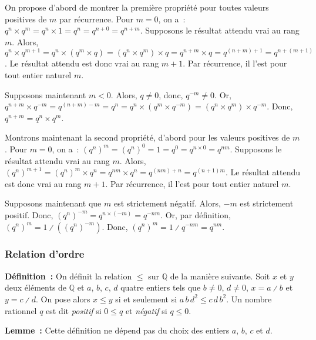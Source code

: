 On propose d'abord de montrer la première propriété pour toutes valeurs positives de $m$ par récurrence. 
Pour $m = 0$, on a : $q^n \times q^m = q^n \times 1 = q^n = q^{n + 0} = q^{n+m}$. 
Supposons le résultat attendu vrai au rang $m$.
Alors, $q^n \times q^{m+1} = q^n \times (q^m \times q) = (q^n \times q^m) \times q = q^{n+m} \times q = q^{(n+m) + 1} = q^{n + (m+1)}$.
Le résultat attendu est donc vrai au rang $m+1$. 
Par récurrence, il l'est pour tout entier naturel $m$.

Supposons maintenant $m < 0$. 
Alors, $q \neq 0$, donc, $q^{-m} \neq 0$.
Or, $q^{n+m} \times q^{-m} = q^{(n+m)-m} = q^n = q^n \times (q^m \times q^{-m}) = (q^n \times q^m) \times q^{-m}$. 
Donc, $q^{n+m} = q^n \times q^m$.

Montrons maintenant la second propriété, d'abord pour les valeurs positives de $m$.
Pour $m = 0$, on a : $(q^n)^m = (q^n)^0 = 1 = q^0 = q^{n \times 0} = q^{n m}$. 
Supposons le résultat attendu vrai au rang $m$.
Alors, $(q^n)^{m+1} = (q^n)^m \times q^n = q^{n m} \times q^n = q^{(n m) + n} = q^{(n+1) m}$.
Le résultat attendu est donc vrai au rang $m+1$. 
Par récurrence, il l'est pour tout entier naturel $m$.

Supposons maintenant que $m$ est strictement négatif.
Alors, $-m$ est strictement positif. 
Donc, $(q^n)^{-m} = q^{n \times (-m)} = q^{- n m}$.
Or, par définition, $(q^n)^m = 1 \divslash ((q^n)^{-m})$. 
Donc, $(q^n)^m = 1 \divslash q^{- n m} = q^{n m}$. 

\done

\subsubsection{Relation d'ordre}

\noindent\textbf{Définition :} On définit la relation $\leq$ sur $\mathbb{Q}$ de la manière suivante. 
    Soit $x$ et $y$ deux éléments de $\mathbb{Q}$ et $a$, $b$, $c$, $d$ quatre entiers tels que $b \neq 0$, $d \neq 0$, $x = a \divslash b$ et $y = c \divslash d$.
    On pose alors $x \leq y$ si et seulement si $a \, b \, d^2 \leq c \, d \, b^2$.
    Un nombre rationnel $q$ est dit \emph{positif} si $0 \leq q$ et \emph{négatif} si $q \leq 0$.

\medskip

\noindent\textbf{Lemme :} Cette définition ne dépend pas du choix des entiers $a$, $b$, $c$ et $d$.

\medskip


